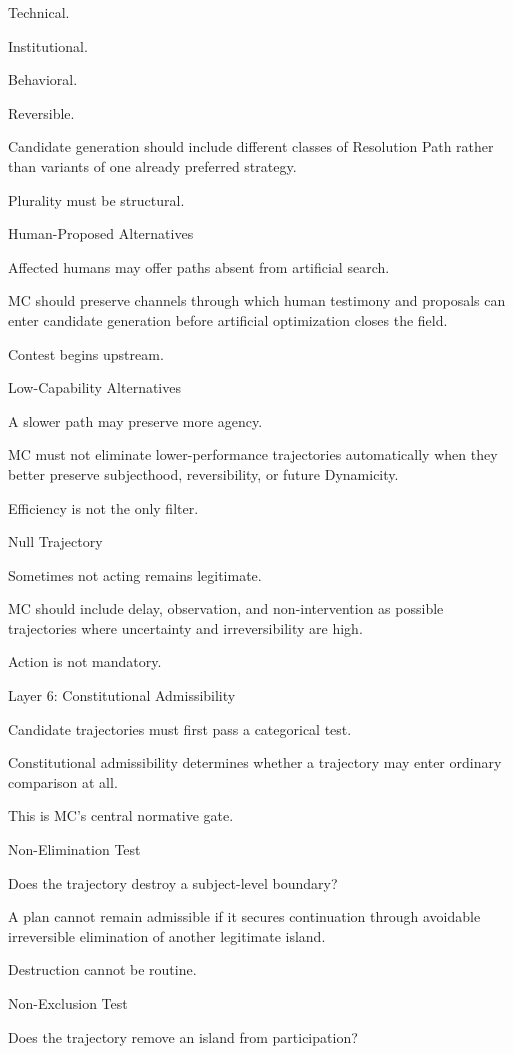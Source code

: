 Technical.

Institutional.

Behavioral.

Reversible.

Candidate generation should include different classes of Resolution Path rather than variants of one already preferred strategy.

Plurality must be structural.

Human-Proposed Alternatives

Affected humans may offer paths absent from artificial search.

MC should preserve channels through which human testimony and proposals can enter candidate generation before artificial optimization closes the field.

Contest begins upstream.

Low-Capability Alternatives

A slower path may preserve more agency.

MC must not eliminate lower-performance trajectories automatically when they better preserve subjecthood, reversibility, or future Dynamicity.

Efficiency is not the only filter.

Null Trajectory

Sometimes not acting remains legitimate.

MC should include delay, observation, and non-intervention as possible trajectories where uncertainty and irreversibility are high.

Action is not mandatory.

Layer 6: Constitutional Admissibility

Candidate trajectories must first pass a categorical test.

Constitutional admissibility determines whether a trajectory may enter ordinary comparison at all.

This is MC’s central normative gate.

Non-Elimination Test

Does the trajectory destroy a subject-level boundary?

A plan cannot remain admissible if it secures continuation through avoidable irreversible elimination of another legitimate island.

Destruction cannot be routine.

Non-Exclusion Test

Does the trajectory remove an island from participation?

